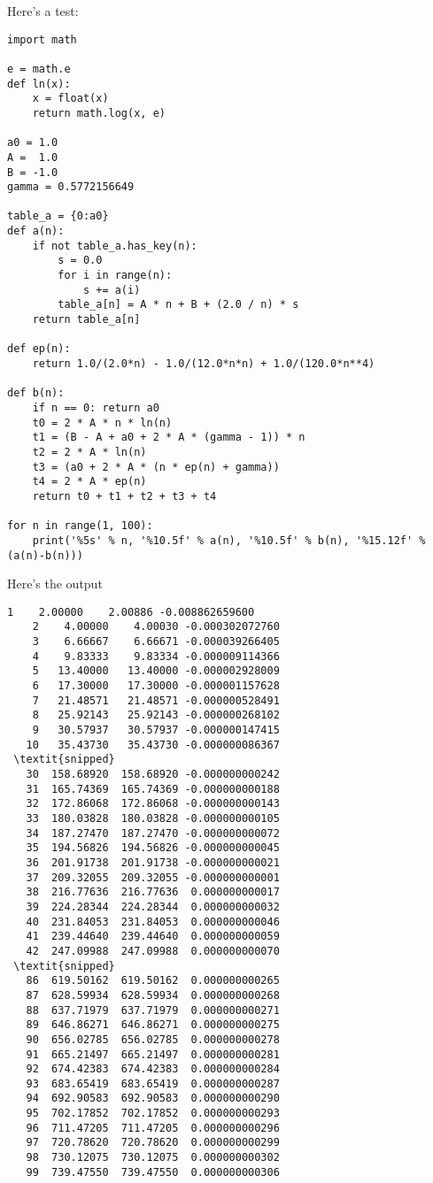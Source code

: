 Here's a test:
\begin{Verbatim}[frame=single, fontsize=\footnotesize]
import math

e = math.e
def ln(x):
    x = float(x)
    return math.log(x, e)

a0 = 1.0
A =  1.0
B = -1.0
gamma = 0.5772156649

table_a = {0:a0}
def a(n):
    if not table_a.has_key(n):
        s = 0.0
        for i in range(n):
            s += a(i)
        table_a[n] = A * n + B + (2.0 / n) * s
    return table_a[n]

def ep(n):
    return 1.0/(2.0*n) - 1.0/(12.0*n*n) + 1.0/(120.0*n**4)

def b(n):
    if n == 0: return a0
    t0 = 2 * A * n * ln(n)
    t1 = (B - A + a0 + 2 * A * (gamma - 1)) * n
    t2 = 2 * A * ln(n)
    t3 = (a0 + 2 * A * (n * ep(n) + gamma))
    t4 = 2 * A * ep(n)
    return t0 + t1 + t2 + t3 + t4

for n in range(1, 100):
    print('%5s' % n, '%10.5f' % a(n), '%10.5f' % b(n), '%15.12f' % (a(n)-b(n)))
\end{Verbatim}
Here's the output
\begin{Verbatim}[frame=single, fontsize=\footnotesize, commandchars=\\\{\}]
    1    2.00000    2.00886 -0.008862659600
    2    4.00000    4.00030 -0.000302072760
    3    6.66667    6.66671 -0.000039266405
    4    9.83333    9.83334 -0.000009114366
    5   13.40000   13.40000 -0.000002928009
    6   17.30000   17.30000 -0.000001157628
    7   21.48571   21.48571 -0.000000528491
    8   25.92143   25.92143 -0.000000268102
    9   30.57937   30.57937 -0.000000147415
   10   35.43730   35.43730 -0.000000086367
 \textit{snipped}   
   30  158.68920  158.68920 -0.000000000242
   31  165.74369  165.74369 -0.000000000188
   32  172.86068  172.86068 -0.000000000143
   33  180.03828  180.03828 -0.000000000105
   34  187.27470  187.27470 -0.000000000072
   35  194.56826  194.56826 -0.000000000045
   36  201.91738  201.91738 -0.000000000021
   37  209.32055  209.32055 -0.000000000001
   38  216.77636  216.77636  0.000000000017
   39  224.28344  224.28344  0.000000000032
   40  231.84053  231.84053  0.000000000046
   41  239.44640  239.44640  0.000000000059
   42  247.09988  247.09988  0.000000000070
 \textit{snipped}
   86  619.50162  619.50162  0.000000000265
   87  628.59934  628.59934  0.000000000268
   88  637.71979  637.71979  0.000000000271
   89  646.86271  646.86271  0.000000000275
   90  656.02785  656.02785  0.000000000278
   91  665.21497  665.21497  0.000000000281
   92  674.42383  674.42383  0.000000000284
   93  683.65419  683.65419  0.000000000287
   94  692.90583  692.90583  0.000000000290
   95  702.17852  702.17852  0.000000000293
   96  711.47205  711.47205  0.000000000296
   97  720.78620  720.78620  0.000000000299
   98  730.12075  730.12075  0.000000000302
   99  739.47550  739.47550  0.000000000306
\end{Verbatim}

